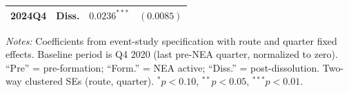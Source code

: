 \begin{table}[H]
\begin{threeparttable}
\begin{tabular}{llcc}
2024Q4 & Diss. & $0.0236^{***}$ & $(0.0085)$ \\
\bottomrule
\end{tabular}
\begin{tablenotes}[flushleft]
\small
\item \textit{Notes:} Coefficients from event-study specification with route and quarter fixed effects. Baseline period is Q4 2020 (last pre-NEA quarter, normalized to zero). ``Pre'' = pre-formation; ``Form.'' = NEA active; ``Diss.'' = post-dissolution. Two-way clustered SEs (route, quarter). $^{*} p<0.10$, $^{**} p<0.05$, $^{***} p<0.01$.
\end{tablenotes}
\end{threeparttable}
\end{table}

